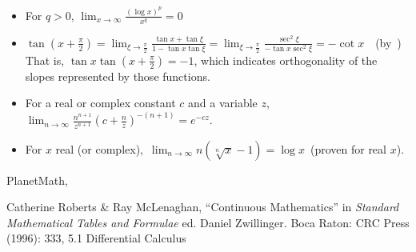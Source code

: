 \documentclass[12pt]{article}
\begin{document}
\begin{itemize}
\item For $q > 0$, $\lim_{x \to \infty} \frac{(\log x)^p}{x^q} = 0$
\item $\tan\left(x+\frac{\pi}{2}\right)=\lim_{\xi\to\frac{\pi}{2}}\frac{\tan x+\tan\xi}{1-\tan x\tan\xi}=
\lim_{\xi\to\frac{\pi}{2}}\frac{\sec^2\xi}{-\tan x\sec^2\xi}=-\cot x$ \,\,
(by\, ) \\
That is, $\tan x\tan(x+\frac{\pi}{2})=-1$, which indicates orthogonality of the slopes represented by those functions.
\item For a real or complex constant $c$ and a variable $z$, \\
$\lim_{n\to\infty} \frac{n^{n+1}}{z^{n+1}}\left(c+\frac{n}{z}\right)^{-(n+1)}=e^{-cz}.$
\item For $x$ real (or complex),\, $\lim_{n\to\infty} n(\sqrt[n]{x}-1) = \log{x}$\, (proven  for real $x$).
\end{itemize}

 PlanetMath, 

\begin{thebibliography}{1}
 Catherine Roberts \& Ray McLenaghan, ``Continuous Mathematics'' in {\it Standard Mathematical Tables and Formulae} ed. Daniel Zwillinger. Boca Raton: CRC Press (1996): 333, 5.1 Differential Calculus
\end{thebibliography}

\end{document}
